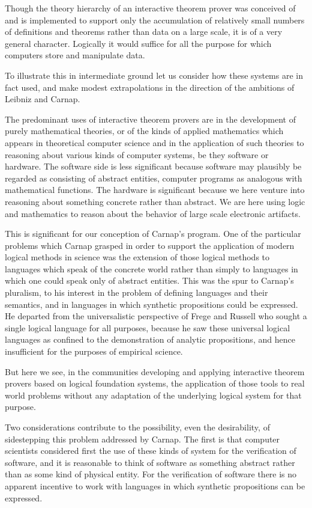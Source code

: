 Though the theory hierarchy of an interactive theorem prover was
conceived of and is implemented to support only the accumulation of
relatively small numbers of definitions and theorems rather than data
on a large scale, it is of a very general character.
Logically it would suffice for all the purpose for which computers
store and manipulate data.

To illustrate this in intermediate ground let us consider how these
systems are in fact used, and make modest extrapolations in the
direction of the ambitions of Leibniz and Carnap.

The predominant uses of interactive theorem provers are in the
development of purely mathematical theories, or of the kinds of
applied mathematics which appears in theoretical computer science and
in the application of such theories to reasoning about various kinds
of computer systems, be they software or hardware.
The software side is less significant because software may plausibly
be regarded as consisting of abstract entities, computer programs as
analogous with mathematical functions.
The hardware is significant because we here venture into reasoning
about something concrete rather than abstract.
We are here using logic and mathematics to reason about the behavior
of large scale electronic artifacts.

This is significant for our conception of Carnap's program.
One of the particular problems which Carnap grasped in order to
support the application of modern logical methods in science was the
extension of those logical methods to languages which speak of the
concrete world rather than simply to languages in which one could
speak only of abstract entities.
This was the spur to Carnap's pluralism, to his interest in the
problem of defining languages and their semantics, and in languages in
which synthetic propositions could be expressed.
He departed from the universalistic perspective of Frege and Russell
who sought a single logical language for all purposes, because he saw
these universal logical languages as confined to the demonstration of
analytic propositions, and hence insufficient for the purposes of
empirical science.

But here we see, in the communities developing and applying
interactive theorem provers based on logical foundation systems, the
application of those tools to real world problems without any
adaptation of the underlying logical system for that purpose.

Two considerations contribute to the possibility, even the
desirability, of sidestepping this problem addressed by Carnap.
The first is that computer scientists considered first the use of
these kinds of system for the verification of software, and it is
reasonable to think of software as something abstract rather than as
some kind of physical entity.
For the verification of software there is no apparent incentive to
work with languages in which synthetic propositions can be expressed.


